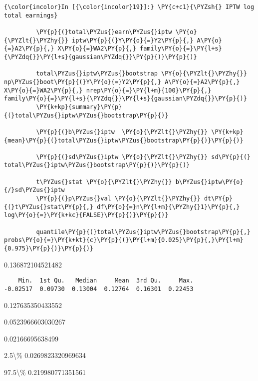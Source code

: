    \begin{Verbatim}[commandchars=\\\{\}]
{\color{incolor}In [{\color{incolor}19}]:} \PY{c+c1}{\PYZsh{} IPTW log total earnings}
         
         \PY{p}{(}total\PYZus{}earn\PYZus{}iptw \PY{o}{\PYZlt{}\PYZhy{}} iptw\PY{p}{(}Y\PY{o}{=}Y2\PY{p}{,} A\PY{o}{=}A2\PY{p}{,} X\PY{o}{=}WA2\PY{p}{,} family\PY{o}{=}\PY{l+s}{\PYZdq{}}\PY{l+s}{gaussian\PYZdq{}}\PY{p}{)}\PY{p}{)}
         
         total\PYZus{}iptw\PYZus{}bootstrap \PY{o}{\PYZlt{}\PYZhy{}} np\PYZus{}boot\PY{p}{(}Y\PY{o}{=}Y2\PY{p}{,} A\PY{o}{=}A2\PY{p}{,} X\PY{o}{=}WA2\PY{p}{,} nrep\PY{o}{=}\PY{l+m}{100}\PY{p}{,} family\PY{o}{=}\PY{l+s}{\PYZdq{}}\PY{l+s}{gaussian\PYZdq{}}\PY{p}{)} 
         \PY{k+kp}{summary}\PY{p}{(}total\PYZus{}iptw\PYZus{}bootstrap\PY{p}{)}
         
         \PY{p}{(}b\PYZus{}iptw  \PY{o}{\PYZlt{}\PYZhy{}} \PY{k+kp}{mean}\PY{p}{(}total\PYZus{}iptw\PYZus{}bootstrap\PY{p}{)}\PY{p}{)}
         
         \PY{p}{(}sd\PYZus{}iptw \PY{o}{\PYZlt{}\PYZhy{}} sd\PY{p}{(}  total\PYZus{}iptw\PYZus{}bootstrap\PY{p}{)}\PY{p}{)}
         
         t\PYZus{}stat \PY{o}{\PYZlt{}\PYZhy{}} b\PYZus{}iptw\PY{o}{/}sd\PYZus{}iptw
         \PY{p}{(}p\PYZus{}val \PY{o}{\PYZlt{}\PYZhy{}} dt\PY{p}{(}t\PYZus{}stat\PY{p}{,} df\PY{o}{=}n\PY{l+m}{\PYZhy{}1}\PY{p}{,} log\PY{o}{=}\PY{k+kc}{FALSE}\PY{p}{)}\PY{p}{)}
         
         quantile\PY{p}{(}total\PYZus{}iptw\PYZus{}bootstrap\PY{p}{,} probs\PY{o}{=}\PY{k+kt}{c}\PY{p}{(}\PY{l+m}{0.025}\PY{p}{,}\PY{l+m}{0.975}\PY{p}{)}\PY{p}{)}
\end{Verbatim}


    0.136872104521482

    
    
    \begin{verbatim}
    Min.  1st Qu.   Median     Mean  3rd Qu.     Max. 
-0.02517  0.09730  0.13004  0.12764  0.16301  0.22453 
    \end{verbatim}

    
    0.127635350433552

    
    0.0523966603030267

    
    0.02166695638499

    
    \begin{description*}
\item[2.5\textbackslash{}\%] 0.0269823320969634
\item[97.5\textbackslash{}\%] 0.219980771351561
\end{description*}


